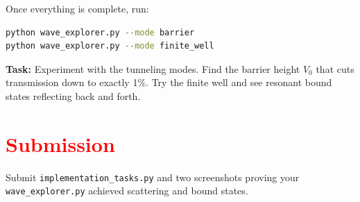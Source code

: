 \documentclass[11pt]{article}
\begin{document}
Once everything is complete, run:
\begin{lstlisting}[language=bash]
python wave_explorer.py --mode barrier
python wave_explorer.py --mode finite_well
\end{lstlisting}

\textbf{Task:} Experiment with the tunneling modes. Find the barrier height $V_0$ that cuts transmission down to exactly 1\%. Try the finite well and see resonant bound states reflecting back and forth.

\section*{\textcolor{red}{Submission}}
Submit \texttt{implementation\_tasks.py} and two screenshots proving your \lstinline|wave_explorer.py| achieved scattering and bound states.
\end{document}
